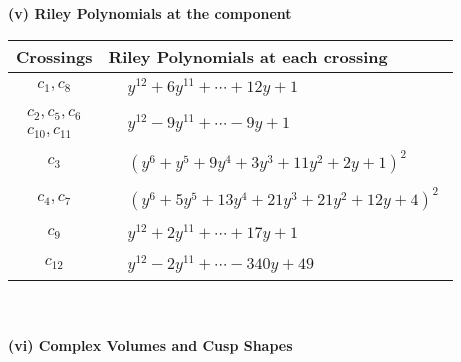 \documentclass[1p]{elsarticle_modified}
\theoremstyle{definition}
\begin{document}
\newpage\renewcommand{\arraystretch}{1}
\flushleft \textbf{(v) Riley Polynomials at the component}\newline \\
\begin{tabular}{m{50pt}|m{274pt}}
Crossings & \hspace{64pt}Riley Polynomials at each crossing \\
\hline $$\begin{aligned}c_{1},c_{8}\end{aligned}$$&$\begin{aligned}
&y^{12}+6 y^{11}+\cdots+12 y+1
\end{aligned}$\\
\hline $$\begin{aligned}c_{2},c_{5},c_{6}\\c_{10},c_{11}\end{aligned}$$&$\begin{aligned}
&y^{12}-9 y^{11}+\cdots-9 y+1
\end{aligned}$\\
\hline $$\begin{aligned}c_{3}\end{aligned}$$&$\begin{aligned}
&(y^6+y^5+9 y^4+3 y^3+11 y^2+2 y+1)^2
\end{aligned}$\\
\hline $$\begin{aligned}c_{4},c_{7}\end{aligned}$$&$\begin{aligned}
&(y^6+5 y^5+13 y^4+21 y^3+21 y^2+12 y+4)^2
\end{aligned}$\\
\hline $$\begin{aligned}c_{9}\end{aligned}$$&$\begin{aligned}
&y^{12}+2 y^{11}+\cdots+17 y+1
\end{aligned}$\\
\hline $$\begin{aligned}c_{12}\end{aligned}$$&$\begin{aligned}
&y^{12}-2 y^{11}+\cdots-340 y+49
\end{aligned}$\\
\hline
\end{tabular}\\~\\
\newpage\flushleft \textbf{(vi) Complex Volumes and Cusp Shapes}
\end{document}
